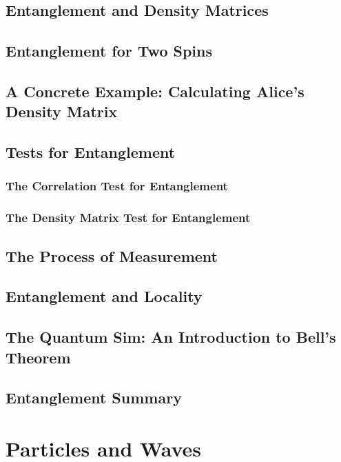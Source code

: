 \documentclass[a4paper]{article}
\begin{document}
\subsection{Entanglement and Density Matrices}
\subsection{Entanglement for Two Spins}
%
%
%
\subsection{A Concrete Example: Calculating Alice's Density Matrix}
%
%
\subsection{Tests for Entanglement}
\subsubsection{The Correlation Test for Entanglement}
%
\subsubsection{The Density Matrix Test for Entanglement}
\subsection{The Process of Measurement}
%
\subsection{Entanglement and Locality}
\subsection{The Quantum Sim: An Introduction to Bell's Theorem}
\subsection{Entanglement Summary}
%
%
\section{Particles and Waves}
\end{document}
